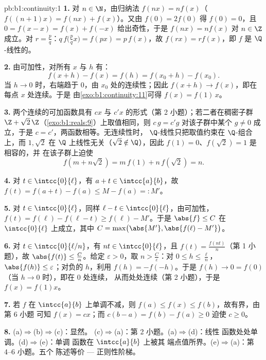 \begin{solution}{pb:b1:continuity:1}
\textbf{1.} 对 $n \in \N$，由归纳法 $f(nx) = n f(x)$（
$f((n+1)x) = f(nx) + f(x)$）。又由 $f(0) = 2f(0)$ 得 $f(0) =
0$，且 $0 = f(x - x) = f(x) + f(-x)$ 给出奇性，于是 $f(nx) =
nf(x)$ 对 $n \in \Z$ 成立。对 $r = \frac pq$：$q\,f\bigl(\tfrac
pq x\bigr) = f(px) = p\,f(x)$，故 $f(rx) = r f(x)$，即 $f$ 是
$\Q$-线性的。

\textbf{2.} 由可加性，对所有 $x$ 与 $h$ 有：
\[
f(x + h) - f(x) = f(h) = f(x_0 + h) - f(x_0) .
\]
当 $h \to 0$ 时，右端趋于 $0$，由
$x_0$ 处的连续性；因此 $f(x + h) \to f(x)$，即在每点 $x$ 处连续。于是
由\cref{exo:b1:continuity:11}可得 $f(x) = f(1)\,x$。

\textbf{3.} 两个连续的可加函数具有
$cx$ 与 $c'x$ 的形式（第 2 小题）；若二者在稠密子群
$\Z + \sqrt2\,\Z$（\cref{exo:b1:reals:9}）上取值相同，则 $c\,g = c'g$
对该子群中某个 $g \neq 0$ 成立，于是 $c = c'$，两函数相等。无连续性时，
$\Q$-线性只把取值约束在
$\Q$-组合上，而 $1, \sqrt2$ 在 $\Q$ 上线性无关（$\sqrt2
\notin \Q$），因此 $f(1) = 0$、$f(\sqrt2) = 1$ 是相容的，并
在该子群上迫使
\[
f(m + n\sqrt2) = m\,f(1) + n\,f(\sqrt2) = n .
\]

\textbf{4.} 对 $t \in \intcc{0}{\ell}$，有 $a + t \in
\intcc{a}{b}$，故 $f(t) = f(a + t) - f(a) \leq M - f(a) =: M'$。

\textbf{5.} 对 $t \in \intcc{0}{\ell}$，同样 $\ell - t \in
\intcc{0}{\ell}$，由可加性，$f(t) = f(\ell) - f(\ell
- t) \geq f(\ell) - M'$。于是 $\abs{f} \leq C$ 在
$\intcc{0}{\ell}$ 上成立，其中 $C = \max\bigl(\abs{M'}, \abs{f(\ell) -
M'}\bigr)$。

\textbf{6.} 对 $t \in \intcc{0}{\ell/n}$，有 $nt \in
\intcc{0}{\ell}$，且 $f(t) = \frac{f(nt)}{n}$（第 1 小题），故
$\abs{f(t)} \leq \frac Cn$。给定 $\varepsilon > 0$，取 $n >
\frac C\varepsilon$：对 $0 \leq h \leq \frac\ell n$，
$\abs{f(h)} \leq \varepsilon$；对负的 $h$，利用 $f(h) =
-f(-h)$。于是 $f(h) \to 0 = f(0)$（当 $h \to 0$ 时），即在 $0$ 处连续，
从而处处连续（第 2 小题），于是 $f(x) = f(1)x$。

\textbf{7.} 若 $f$ 在 $\intcc{a}{b}$ 上单调不减，则
$f(a) \leq f(x) \leq f(b)$，故有界，由第 6 小题
可知 $f(x) = cx$；而 $c(b - a) = f(b) - f(a) \geq 0$ 迫使 $c
\geq 0$。

\textbf{8.} (a)$\Rightarrow$(b)$\Rightarrow$(c)：显然。
(c)$\Rightarrow$(a)：第 2 小题。(a)$\Rightarrow$(d)：线性
函数处处单调。(d)$\Rightarrow$(e)：单调
函数在 $\intcc{a}{b}$ 上被其
端点值所界。(e)$\Rightarrow$(a)：第 4--6 小题。五个
陈述等价 --- 正则性阶梯。


\end{solution}
